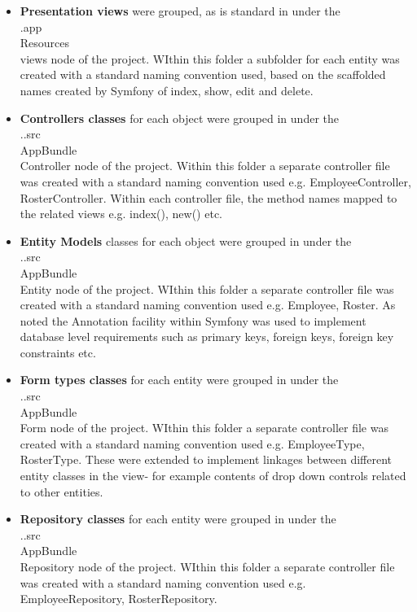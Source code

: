 \documentclass[a4paper,12pt]{article}
\begin{document}
\begin {itemize}
\item \textbf{Presentation views} were grouped, as is standard in under the \\.app\\Resources\\views node of the project. WIthin this folder a subfolder for each entity was created with a standard naming convention used, based on the scaffolded names created by Symfony of index, show, edit and delete.
\item \textbf{Controllers classes} for each object were grouped in under the \\..src\\AppBundle\\Controller node of the project. Within this folder a separate controller file was created with a standard naming convention used e.g. EmployeeController, RosterController. Within each controller file, the method names mapped to the related views e.g. index(), new() etc.
\item \textbf{Entity Models} classes for each object were grouped in under the \\..src\\AppBundle\\Entity node of the project. WIthin this folder a separate controller file was created with a standard naming convention used e.g. Employee, Roster. As noted the Annotation facility within Symfony was used to implement database level requirements such as primary keys, foreign keys, foreign key constraints etc.
\item \textbf{Form types classes} for each entity were grouped in under the \\..src\\AppBundle\\Form node of the project. WIthin this folder a separate controller file was created with a standard naming convention used e.g. EmployeeType, RosterType. These were extended to implement linkages between different entity classes in the view- for example contents of drop down controls related to other entities.
\item \textbf{Repository classes} for each entity were grouped in under the \\..src\\AppBundle\\Repository node of the project. WIthin this folder a separate controller file was created with a standard naming convention used e.g. EmployeeRepository, RosterRepository. 

\end{itemize}
\end{document}
